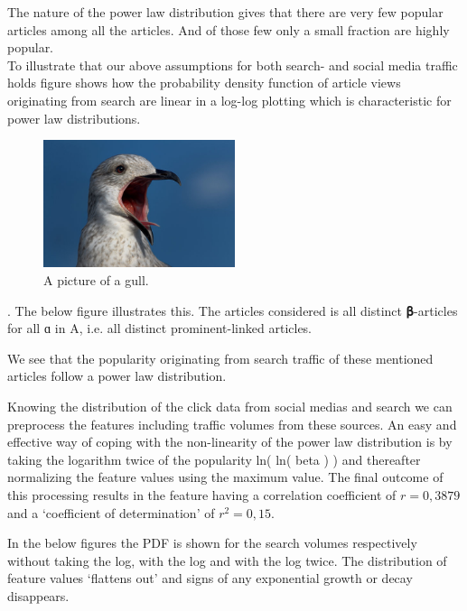 The nature of the power law distribution gives that there are very few popular articles among all the articles. And of those few only a small fraction are highly popular.\\

To illustrate that our above assumptions for both search- and social media traffic holds figure  shows how the probability density function of article views originating from search are linear in a log-log plotting which is characteristic for power law distributions.\\


\begin{figure}[h]
  \caption{A picture of a gull.}
  \centering
    \includegraphics[width=0.5\textwidth]{images/gull}
\end{figure}

. The below figure illustrates this. The articles considered is all distinct 𝛃-articles for all ɑ in A, i.e. all distinct prominent-linked articles.

We see that the popularity originating from search traffic of these mentioned articles follow a power law distribution.

Knowing the distribution of the click data from social medias and search we can preprocess the features including traffic volumes from these sources. An easy and effective way of coping with the non-linearity of the power law distribution is by taking the logarithm twice of the popularity ln( ln( beta ) ) and thereafter normalizing the feature values using the maximum value.
The final outcome of this processing results in the feature having a correlation coefficient of $r = 0,3879$ and a `coefficient of determination' of $r^2 = 0,15$.  

In the below figures the PDF is shown for the search volumes respectively without taking the log, with the log and with the log twice. The distribution of feature values `flattens out' and signs of any exponential growth or decay disappears.

